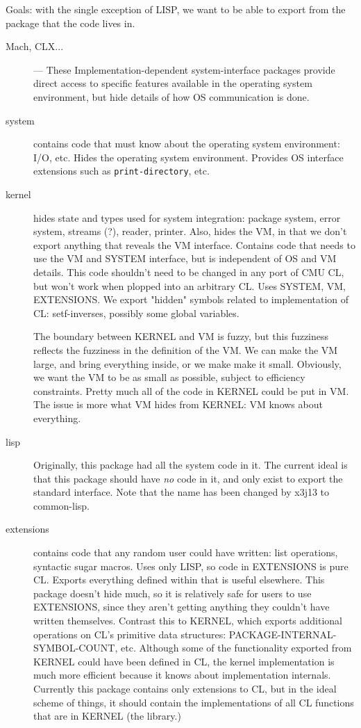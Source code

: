 Goals: with the single exception of LISP, we want to be able to export from the
package that the code lives in.

\begin{description}
\item[Mach, CLX...] --- These Implementation-dependent system-interface
packages provide direct access to specific features available in the operating
system environment, but hide details of how OS communication is done.

\item[system] contains code that must know about the operating system
environment: I/O, etc.  Hides the operating system environment.  Provides OS
interface extensions such as {\tt print-directory}, etc.

\item[kernel] hides state and types used for system integration: package
system, error system, streams (?), reader, printer.  Also, hides the VM, in
that we don't export anything that reveals the VM interface.  Contains code
that needs to use the VM and SYSTEM interface, but is independent of OS and VM
details.  This code shouldn't need to be changed in any port of CMU CL, but
won't work when plopped into an arbitrary CL.  Uses SYSTEM, VM, EXTENSIONS.  We
export "hidden" symbols related to implementation of CL: setf-inverses,
possibly some global variables.

The boundary between KERNEL and VM is fuzzy, but this fuzziness reflects the
fuzziness in the definition of the VM.  We can make the VM large, and bring
everything inside, or we make make it small.  Obviously, we want the VM to be
as small as possible, subject to efficiency constraints.  Pretty much all of
the code in KERNEL could be put in VM.  The issue is more what VM hides from
KERNEL: VM knows about everything.

\item[lisp]  Originally, this package had all the system code in it.  The
current ideal is that this package should have {\it no} code in it, and only
exist to export the standard interface.  Note that the name has been changed by
x3j13 to common-lisp.

\item[extensions] contains code that any random user could have written: list
operations, syntactic sugar macros.  Uses only LISP, so code in EXTENSIONS is
pure CL.  Exports everything defined within that is useful elsewhere.  This
package doesn't hide much, so it is relatively safe for users to use
EXTENSIONS, since they aren't getting anything they couldn't have written
themselves.  Contrast this to KERNEL, which exports additional operations on
CL's primitive data structures: PACKAGE-INTERNAL-SYMBOL-COUNT, etc.  Although
some of the functionality exported from KERNEL could have been defined in CL,
the kernel implementation is much more efficient because it knows about
implementation internals.  Currently this package contains only extensions to
CL, but in the ideal scheme of things, it should contain the implementations of
all CL functions that are in KERNEL (the library.)


\end{description}
